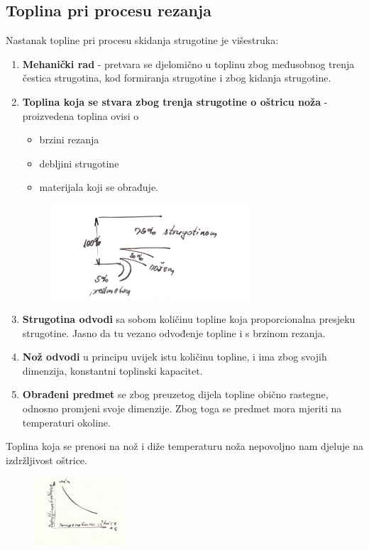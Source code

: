 \documentclass[a4paper,12pt]{article}
\numberwithin{figure}{section}
\begin{document}
\subsection{Toplina pri procesu rezanja}
Nastanak topline pri procesu skidanja strugotine je višestruka:
\begin{enumerate}
\item \textbf{Mehanički rad} - pretvara se djelomično u toplinu zbog međusobnog trenja čestica strugotina, kod formiranja strugotine i zbog kidanja strugotine.
\item \textbf{Toplina koja se stvara zbog trenja strugotine o oštricu noža} - proizvedena toplina ovisi o 
\begin{itemize}
\item brzini rezanja
\item debljini strugotine
\item materijala koji se obrađuje.
\end{itemize}
\begin{figure}[!h]
\includegraphics[width=0.7\textwidth]{image_11-1.png}
\end{figure}
\FloatBarrier
\item \textbf{Strugotina odvodi} sa sobom količinu topline koja proporcionalna presjeku strugotine. Jasno da tu vezano odvođenje topline i s brzinom rezanja.
\item \textbf{Nož odvodi} u principu uvijek istu količinu topline, i ima zbog svojih dimenzija, konstantni toplinski kapacitet.
\item \textbf{Obrađeni predmet} se zbog preuzetog dijela topline obično rastegne, odnosno promjeni svoje dimenzije. Zbog toga se predmet mora mjeriti na temperaturi okoline.
\end{enumerate}
Toplina koja se prenosi na nož i diže temperaturu noža nepovoljno nam djeluje na izdržljivost oštrice.
\begin{figure}
\vspace{-0.5cm}
  \begin{center}
    \includegraphics[width=0.3\textwidth]{image_11-2.png}
  \end{center}
  \vspace{-1cm}
\end{figure}
\end{document}
